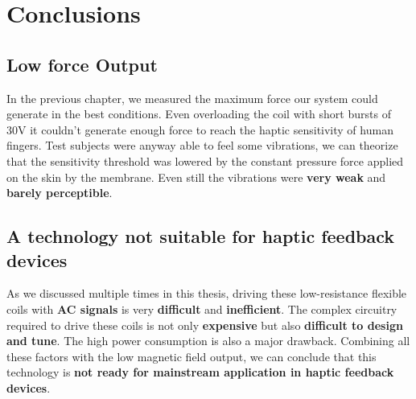 \section{Conclusions}
\subsection{Low force Output}
In the previous chapter, we measured the maximum force our system could generate in the best conditions.
Even overloading the coil with short bursts of 30V it couldn't generate enough force to reach the haptic sensitivity of human fingers. Test subjects were anyway able to feel some vibrations, we can theorize that the sensitivity threshold was lowered by the constant pressure force applied on the skin by the membrane.
Even still the vibrations were \textbf{very weak} and \textbf{barely perceptible}.
\subsection{A technology not suitable for haptic feedback devices}
As we discussed multiple times in this thesis, driving these low-resistance flexible coils with \textbf{AC signals} is very \textbf{difficult} and \textbf{inefficient}.
The complex circuitry required to drive these coils is not only \textbf{expensive} but also \textbf{difficult to design and tune}.
The high power consumption is also a major drawback.
Combining all these factors with the low magnetic field output, we can conclude that this technology is \textbf{not ready for mainstream application in haptic feedback devices}.